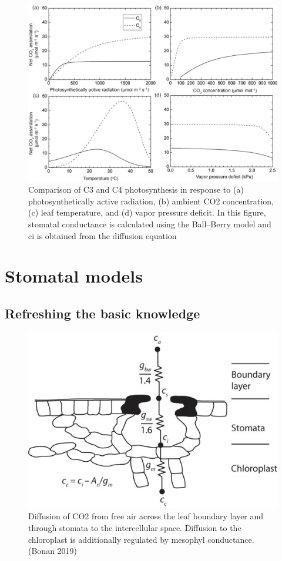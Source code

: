 \documentclass[
  oneside]{book}
\begin{document}
\begin{figure}

{\centering \includegraphics[width=0.8\linewidth]{figures/chap2/c3_c4} 

}

\caption{Comparison of C3 and C4 photosynthesis in response to (a) photosynthetically active radiation, (b) ambient CO2 concentration, (c) leaf temperature, and (d) vapor pressure deficit. In this figure, stomatal conductance is calculated using the Ball–Berry model and ci is obtained from the diffusion equation}\label{fig:f210b}
\end{figure}

\hypertarget{stomatal-models}{%
\section{Stomatal models}\label{stomatal-models}}

\hypertarget{refreshing-the-basic-knowledge-1}{%
\subsection{Refreshing the basic knowledge}\label{refreshing-the-basic-knowledge-1}}

\begin{figure}

{\centering \includegraphics[width=0.8\linewidth]{figures/chap2/conductance} 

}

\caption{Diffusion of CO2 from free air across the leaf boundary layer and through stomata to the intercellular space. Diffusion to the chloroplast is additionally regulated by mesophyl conductance. (Bonan 2019)}\label{fig:f211}
\end{figure}
\end{document}
